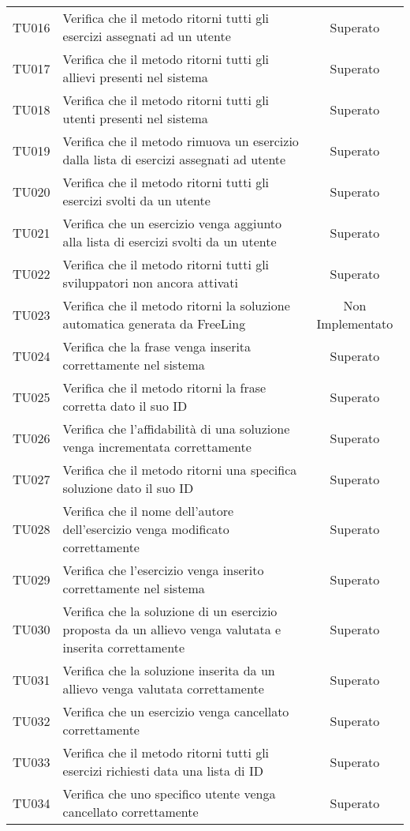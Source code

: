 \begin{tabularx}{\textwidth}{cXc}
		TU016 & Verifica che il metodo ritorni tutti gli esercizi assegnati ad un utente & Superato \\
		TU017 & Verifica che il metodo ritorni tutti gli allievi presenti nel sistema & Superato \\
		TU018 & Verifica che il metodo ritorni tutti gli utenti presenti nel sistema & Superato \\
		TU019 & Verifica che il metodo rimuova un esercizio dalla lista di esercizi assegnati ad utente & Superato \\
		TU020 & Verifica che il metodo ritorni tutti gli esercizi svolti da un utente & Superato \\
		TU021 & Verifica che un esercizio venga aggiunto alla lista di esercizi svolti da un utente & Superato \\
		TU022 & Verifica che il metodo ritorni tutti gli sviluppatori non ancora attivati & Superato \\
		TU023 & Verifica che il metodo ritorni la soluzione automatica generata da FreeLing & Non Implementato \\
		TU024 & Verifica che la frase venga inserita correttamente nel sistema & Superato \\
		TU025 & Verifica che il metodo ritorni la frase corretta dato il suo ID & Superato \\
		TU026 & Verifica che l'affidabilità di una soluzione venga incrementata correttamente & Superato \\
		TU027 & Verifica che il metodo ritorni una specifica soluzione dato il suo ID & Superato \\
		TU028 & Verifica che il nome dell'autore dell'esercizio venga modificato correttamente & Superato \\
		TU029 & Verifica che l'esercizio venga inserito correttamente nel sistema & Superato \\
		TU030 & Verifica che la soluzione di un esercizio proposta da un allievo venga valutata e inserita correttamente & Superato \\
		TU031 & Verifica che la soluzione inserita da un allievo venga valutata correttamente & Superato \\
		TU032 & Verifica che un esercizio venga cancellato correttamente & Superato \\
		TU033 & Verifica che il metodo ritorni tutti gli esercizi richiesti data una lista di ID & Superato \\
		TU034 & Verifica che uno specifico utente venga cancellato correttamente & Superato \\

\end{tabularx}
